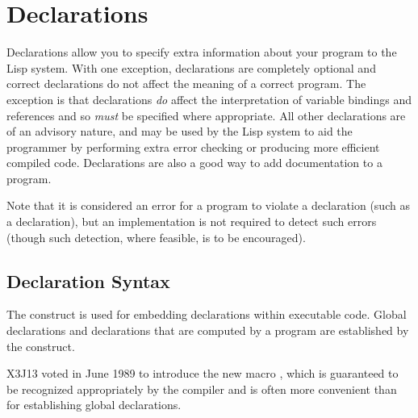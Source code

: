 
\clearpage\def\pagestatus{ULTIMATE}

\chapter{Declarations}
\label{DECLAR}

Declarations allow you to specify extra information about your program
to the Lisp system.  With one exception,
declarations are completely optional
and correct declarations do not affect the meaning
of a correct program.  The exception is that
 declarations {\it do} affect the interpretation of variable
bindings and references and so {\it must} be specified where appropriate.
All other declarations are of an advisory nature, and may be used
by the Lisp system to aid the programmer by performing extra error checking
or producing more efficient compiled code.  Declarations are also
a good way to add documentation to a program.

Note that it is considered an error for a program to violate a
declaration (such as a  declaration), but an implementation is
not required to detect such errors (though such detection, where
feasible, is to be encouraged).

\section{Declaration Syntax}
\label{DECLARE-SYNTAX-SECTION}

The  construct is used for embedding declarations within
executable code.  Global declarations and declarations that are computed
by a program are established by the  construct.

\begin{newer}
X3J13 voted in June 1989 
to introduce the new macro , which is guaranteed
to be recognized appropriately by the compiler and is often more convenient
than  for establishing global declarations.
\end{newer}

